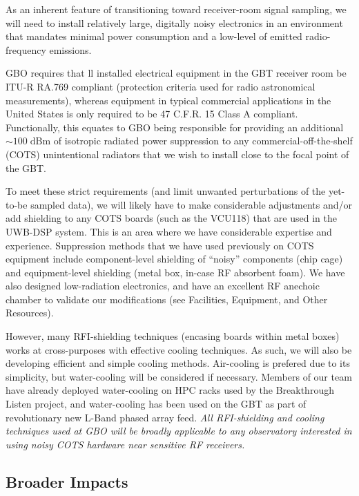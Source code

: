 \documentclass[10pt]{myNSF}
\begin{document}

As an inherent feature of transitioning toward receiver-room signal
sampling, we will need to install relatively large, digitally noisy
electronics in an environment that mandates minimal power consumption
and a low-level of emitted radio-frequency emissions.

GBO requires that ll installed electrical equipment in the GBT
receiver room be ITU-R RA.769 compliant (protection criteria used for
radio astronomical measurements), whereas equipment in typical
commercial applications in the United States is only required to be 47
C.F.R. 15 Class A compliant. Functionally, this equates to GBO being
responsible for providing an additional $\sim 100\; \mathrm{dBm}$ of
isotropic radiated power suppression to any commercial-off-the-shelf
(COTS) unintentional radiators that we wish to install close to the
focal point of the GBT.  

To meet these strict requirements (and limit unwanted perturbations of
the yet-to-be sampled data), we will likely have to make considerable
adjustments and/or add shielding to any COTS boards (such as the
VCU118) that are used in the UWB-DSP system.  This is an area where we
have considerable expertise and experience. Suppression methods that
we have used previously on COTS equipment include component-level
shielding of ``noisy'' components (chip cage) and equipment-level
shielding (metal box, in-case RF absorbent foam). We have also
designed low-radiation electronics, and have an excellent RF anechoic
chamber to validate our modifications (see Facilities, Equipment, and
Other Resources).

However, many RFI-shielding techniques (encasing boards within metal
boxes) works at cross-purposes with effective cooling techniques. As
such, we will also be developing efficient and simple cooling methods.
Air-cooling is prefered due to its simplicity, but water-cooling will
be considered if necessary.  Members of our team have already deployed
water-cooling on HPC racks used by the Breakthrough Listen project,
and water-cooling has been used on the GBT as part of revolutionary
new L-Band phased array feed.  \emph{All RFI-shielding and cooling
  techniques used at GBO will be broadly applicable to any observatory
  interested in using noisy COTS hardware near sensitive RF
  receivers.}

\subsection{Broader Impacts}
\label{sec:BI}
\end{document}
